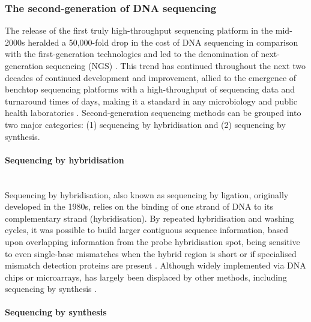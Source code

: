 \subsubsection{The second-generation of DNA sequencing} \label{ssec:2nd_gen_seq}

The release of the first truly high-throughput sequencing platform in the mid-2000s heralded a 50,000-fold drop in the cost of DNA sequencing in comparison with the first-generation technologies and led to the denomination of next-generation sequencing (NGS) \citep{goodwin_coming_2016}. 
This trend has continued throughout the next two decades of continued development and improvement, allied to the emergence of benchtop sequencing platforms with a high-throughput of sequencing data and turnaround times of days, making it a standard in any microbiology and public health laboratories \citep{loman_twenty_2015}. 
Second-generation sequencing methods can be grouped into two major categories: (1) sequencing by hybridisation and (2) sequencing by synthesis. 

\paragraph{Sequencing by hybridisation} \label{sssec:2nd_gen_seq_hybrid} \mbox{}\\

Sequencing by hybridisation, also known as sequencing by ligation, originally developed in the 1980s, relies on the binding of one strand of DNA to its complementary strand (hybridisation). 
By repeated hybridisation and washing cycles, it was possible to build larger contiguous sequence information, based upon overlapping information from the probe hybridisation spot, being sensitive to even single-base mismatches when the hybrid region is short or if specialised mismatch detection proteins are present \citep{slatko_overview_2018, detter_nucleic_2014}. 
Although widely implemented via DNA chips or microarrays, has largely been displaced by other methods, including sequencing by synthesis \citep{goodwin_coming_2016}. 

\paragraph{Sequencing by synthesis} \label{sssec:2nd_gen_seq_synth} \mbox{}\\

